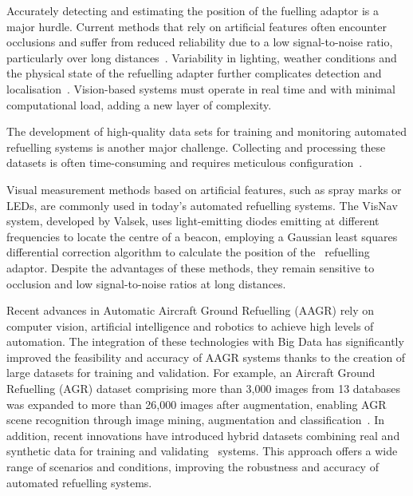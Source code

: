 \documentclass[12pt,oneside]{book} %
\begin{document}
Accurately detecting and estimating the position of the fuelling adaptor is a
major hurdle. Current methods that rely on artificial features often encounter
occlusions and suffer from reduced reliability due to a low signal-to-noise
ratio, particularly over long distances~\cite{AGRPoseEstimation}. Variability
in lighting, weather conditions and the physical state of the refuelling
adapter further complicates detection and
localisation~\cite{HybridDatasetAGRV1}. Vision-based systems must operate in
real time and with minimal computational load, adding a new layer of
complexity.

The development of high-quality data sets for training and monitoring automated
refuelling systems is another major challenge. Collecting and processing these
datasets is often time-consuming and requires meticulous
configuration~\cite{HybridDatasetAGRV2}.

Visual measurement methods based on artificial features, such as spray marks or
LEDs, are commonly used in today's automated refuelling systems. The VisNav
system, developed by Valsek, uses light-emitting diodes emitting at different
frequencies to locate the centre of a beacon, employing a Gaussian least
squares differential correction algorithm to calculate the position of
the~\cite{AGRPoseEstimation} refuelling adaptor. Despite the advantages of
these methods, they remain sensitive to occlusion and low signal-to-noise
ratios at long distances.

Recent advances in Automatic Aircraft Ground Refuelling (AAGR) rely on computer
vision, artificial intelligence and robotics to achieve high levels of
automation. The integration of these technologies with Big Data has
significantly improved the feasibility and accuracy of AAGR systems thanks to
the creation of large datasets for training and validation. For example, an
Aircraft Ground Refuelling (AGR) dataset comprising more than 3,000 images from
13 databases was expanded to more than 26,000 images after augmentation,
enabling AGR scene recognition through image mining, augmentation and
classification~\cite{DatasetAGR}. In addition, recent innovations have
introduced hybrid datasets combining real and synthetic data for training and
validating~\cite{HybridDatasetAGRV1} systems. This approach offers a wide range
of scenarios and conditions, improving the robustness and accuracy of automated
refuelling systems.
\end{document}
